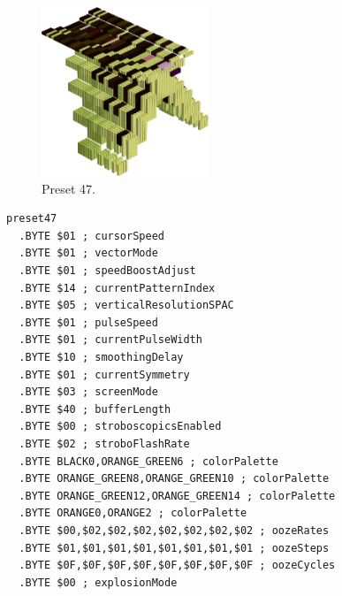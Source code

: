 \vspace*{0.5cm}
\begin{minipage}[b]{0.48\linewidth}
\begin{figure}[H]                                                          
  \centering                                                             
  \begin{adjustbox}{width=5cm,center}                                   
  \includegraphics[width=5cm]{src/colorspace_presets/preset47-45.png}%
  \end{adjustbox}                                                        
\caption*{Preset 47.}                                           
\end{figure}                                                               
\end{minipage}
\hspace{0.1cm}
\begin{minipage}[b]{0.48\linewidth}                                                                         
\begin{lstlisting}[basicstyle=\ttfamily\tiny]
preset47
  .BYTE $01 ; cursorSpeed
  .BYTE $01 ; vectorMode
  .BYTE $01 ; speedBoostAdjust
  .BYTE $14 ; currentPatternIndex
  .BYTE $05 ; verticalResolutionSPAC
  .BYTE $01 ; pulseSpeed
  .BYTE $01 ; currentPulseWidth
  .BYTE $10 ; smoothingDelay
  .BYTE $01 ; currentSymmetry
  .BYTE $03 ; screenMode
  .BYTE $40 ; bufferLength
  .BYTE $00 ; stroboscopicsEnabled
  .BYTE $02 ; stroboFlashRate
  .BYTE BLACK0,ORANGE_GREEN6 ; colorPalette
  .BYTE ORANGE_GREEN8,ORANGE_GREEN10 ; colorPalette
  .BYTE ORANGE_GREEN12,ORANGE_GREEN14 ; colorPalette
  .BYTE ORANGE0,ORANGE2 ; colorPalette
  .BYTE $00,$02,$02,$02,$02,$02,$02,$02 ; oozeRates
  .BYTE $01,$01,$01,$01,$01,$01,$01,$01 ; oozeSteps
  .BYTE $0F,$0F,$0F,$0F,$0F,$0F,$0F,$0F ; oozeCycles
  .BYTE $00 ; explosionMode
\end{lstlisting}
\end{minipage}


